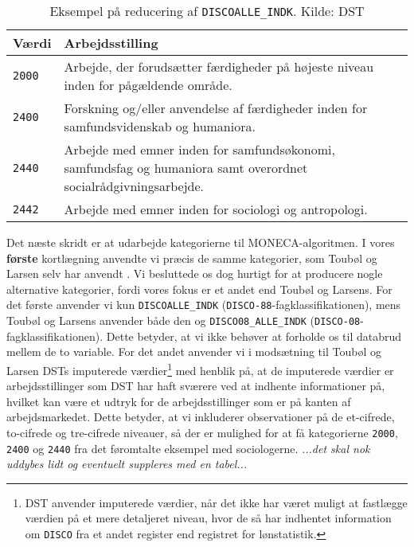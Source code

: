 % 
\begin{table}[H] \centering
\caption{Eksempel på reducering af \texttt{DISCOALLE\_INDK}. Kilde: DST}
\label{tab_reducering}
\begin{tabular}{@{} l m{11cm} @{}} \toprule
Værdi  & Arbejdsstilling \\ \midrule
  \texttt{2000} & Arbejde, der forudsætter færdigheder på højeste niveau inden for pågældende område. \\ 
  \texttt{2400} & Forskning og/eller anvendelse af færdigheder inden for samfundsvidenskab og humaniora. \\ 
  \texttt{2440} & Arbejde med emner inden for samfundsøkonomi, samfundsfag og humaniora samt overordnet socialrådgivningsarbejde. \\ 
  \texttt{2442} & Arbejde med emner inden for sociologi og antropologi. \\ \bottomrule
\end{tabular} \end{table}
%
Det næste skridt er at udarbejde kategorierne til MONECA-algoritmen. I vores \textbf{første} kortlægning anvendte vi præcis de samme kategorier, som Toubøl og Larsen selv har anvendt \parencite{TouboelLarsen2015}. Vi besluttede os dog hurtigt for at producere nogle alternative kategorier, fordi vores fokus er et andet end Toubøl og Larsens. For det første anvender vi kun \texttt{DISCOALLE\_INDK} (\texttt{DISCO-88}-fagklassifikationen), mens Toubøl og Larsens anvender både den og \texttt{DISCO08\_ALLE\_INDK} (\texttt{DISCO-08}-fagklassifikationen). Dette betyder, at vi ikke behøver at forholde os til databrud mellem de to variable. For det andet anvender vi i modsætning til Toubøl og Larsen DSTs imputerede værdier\footnote{DST anvender imputerede værdier, når det ikke har været muligt at fastlægge værdien på et mere detaljeret niveau, hvor de så har indhentet information om \texttt{DISCO} fra et andet register end registret for lønstatistik.} med henblik på, at de imputerede værdier er arbejdsstillinger som DST har haft sværere ved at indhente informationer på, hvilket kan være et udtryk for de arbejdsstillinger som er på kanten af arbejdsmarkedet. Dette betyder, at vi inkluderer observationer på de et-cifrede, to-cifrede og tre-cifrede niveauer, så der er mulighed for at få kategorierne \texttt{2000}, \texttt{2400} og \texttt{2440} fra det føromtalte eksempel med sociologerne. \emph{...det skal nok uddybes lidt og eventuelt suppleres med en tabel...} %

